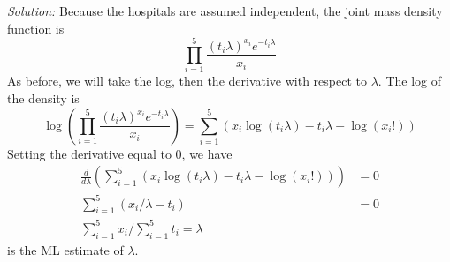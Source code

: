 \documentclass{article}
\begin{document}
\begin{enumerate}
\begin{enumerate}
\textit{Solution:} Because the hospitals are assumed independent, the joint mass density function is 
\[
\prod_{i=1}^5 \frac{(t_i \lambda)^{x_i}e^{-t_i \lambda}}{x_i}
\]
As before, we will take the log, then the derivative with respect to $\lambda$. The log of the density is 
\[
\log (\prod_{i=1}^5 \frac{(t_i \lambda)^{x_i}e^{-t_i \lambda}}{x_i}) = \sum_{i=1}^5(x_i \log(t_i \lambda) - t_i \lambda - \log(x_i!))
\]
Setting the derivative equal to 0, we have
\begin{align*}
\frac{d}{d \lambda} (\sum_{i=1}^5(x_i \log(t_i \lambda) - t_i \lambda - \log(x_i!))) &= 0 \\
\sum_{i=1}^5 (x_i / \lambda - t_i)&= 0 \\
\sum_{i=1}^5 x_i / \sum_{i=1}^5 t_i = \lambda
\end{align*}
is the ML estimate of $\lambda$.

\end{enumerate}

\end{enumerate}
\end{document}
